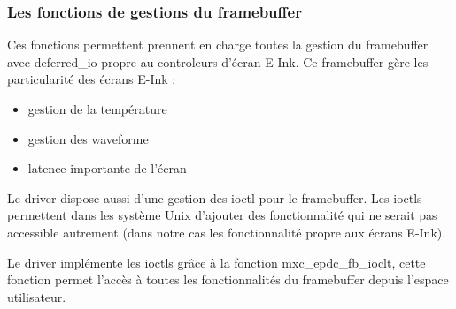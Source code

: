 \subsubsection{Les fonctions de gestions du framebuffer}

Ces fonctions permettent prennent en charge toutes la gestion du framebuffer avec deferred\_io 
propre au controleurs d'écran E-Ink.
Ce framebuffer gère les particularité des écrans E-Ink : 
	\begin{itemize}
		\item gestion de la température
		\item gestion des waveforme
		\item latence importante de l'écran
	\end{itemize}

Le driver dispose aussi d'une gestion des ioctl pour le framebuffer.
Les ioctls permettent dans les système Unix d'ajouter des fonctionnalité qui ne serait pas accessible autrement (dans notre cas les fonctionnalité propre aux écrans E-Ink).

Le driver implémente les ioctls grâce à la fonction mxc\_epdc\_fb\_ioclt, cette fonction permet l'accès à toutes les fonctionnalités du framebuffer depuis l'espace utilisateur.
